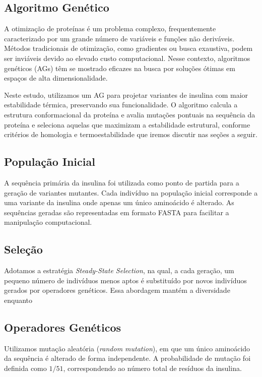 \documentclass[12pt]{extarticle}
\begin{document}
\subsection{Algoritmo Genético}

A otimização de proteínas é um problema complexo, frequentemente caracterizado
por um grande número de variáveis e funções não deriváveis. Métodos
tradicionais de otimização, como gradientes ou busca exaustiva, podem ser
inviáveis devido ao elevado custo computacional. Nesse contexto, algoritmos
genéticos (AGs) têm se mostrado eficazes na busca por soluções ótimas em
espaços de alta dimensionalidade.

Neste estudo, utilizamos um AG para projetar variantes de insulina com maior
estabilidade térmica, preservando sua funcionalidade. O algoritmo calcula a
estrutura conformacional da proteína e avalia mutações pontuais na sequência da
proteína e seleciona aquelas que maximizam a estabilidade estrutural, conforme
critérios de homologia e termoestabilidade que iremos discutir nas seções a
seguir.

\subsection{População Inicial}

A sequência primária da insulina foi utilizada como ponto de partida para a
geração de variantes mutantes. Cada indivíduo na população inicial corresponde
a uma variante da insulina onde apenas um único aminoácido é alterado. As
sequências geradas são representadas em formato FASTA para facilitar a
manipulação computacional.

\subsection{Seleção} 

Adotamos a estratégia \textit{Steady-State Selection}, na qual, a cada geração,
um pequeno número de indivíduos menos aptos é substituído por novos indivíduos
gerados por operadores genéticos. Essa abordagem mantém a diversidade enquanto

\subsection{Operadores Genéticos}

Utilizamos mutação aleatória (\textit{random mutation}), em que um único
aminoácido da sequência é alterado de forma independente. A probabilidade
de mutação foi definida como \(1/51\), correspondendo ao número total de
resíduos da insulina. 
\end{document}
